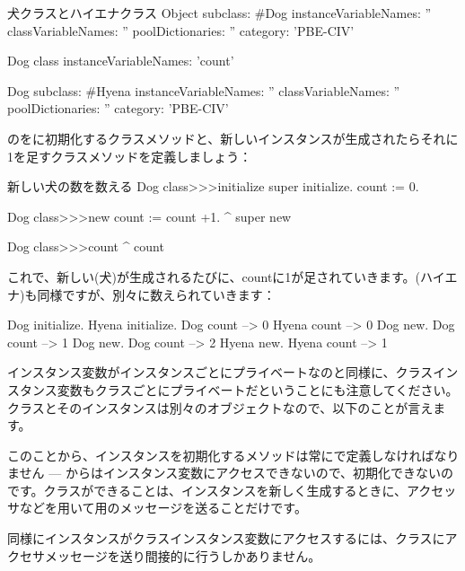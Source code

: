 \documentclass[a4paper,10pt,twoside]{book}
\begin{document}
\begin{classdef}[dog]{犬クラスとハイエナクラス}
Object subclass: #Dog
	instanceVariableNames: ''
	classVariableNames: ''
	poolDictionaries: ''
	category: 'PBE-CIV'

Dog class
	instanceVariableNames: 'count'

Dog subclass: #Hyena
	instanceVariableNames: ''
	classVariableNames: ''
	poolDictionaries: ''
	category: 'PBE-CIV'
\end{classdef}

のをに初期化するクラスメソッドと、新しいインスタンスが生成されたらそれに1を足すクラスメソッドを定義しましょう：

\begin{method}[dogcount]{新しい犬の数を数える}
Dog class>>>initialize
	super initialize.
	count := 0.

Dog class>>>new
	count := count +1.
	^ super new

Dog class>>>count
	^ count
\end{method}

これで、新しい(犬)が生成されるたびに、countに1が足されていきます。(ハイエナ)も同様ですが、別々に数えられていきます：
\begin{code}{}
Dog initialize.
Hyena initialize.
Dog count     --> 0
Hyena count --> 0
Dog new.
Dog count     --> 1
Dog new.
Dog count     --> 2
Hyena new.
Hyena count --> 1
\end{code}

インスタンス変数がインスタンスごとにプライベートなのと同様に、クラスインスタンス変数もクラスごとにプライベートだということにも注意してください。クラスとそのインスタンスは別々のオブジェクトなので、以下のことが言えます。

このことから、インスタンスを初期化するメソッドは常にで定義しなければなりません --- からはインスタンス変数にアクセスできないので、初期化できないのです。クラスができることは、インスタンスを新しく生成するときに、アクセッサなどを用いて用のメッセージを送ることだけです。

同様にインスタンスがクラスインスタンス変数にアクセスするには、クラスにアクセサメッセージを送り間接的に行うしかありません。
\end{document}
